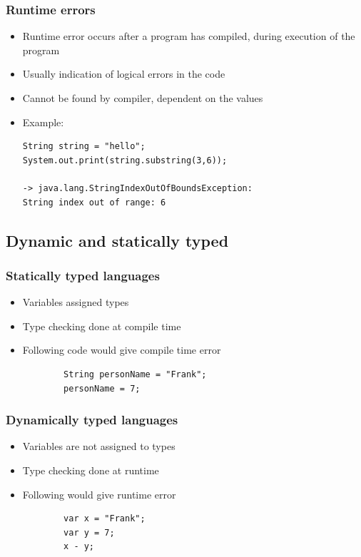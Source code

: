 \documentclass{beamer}
\begin{document}
\begin{frame}[fragile]
	\frametitle{Runtime errors}
		\begin{itemize}
			\item Runtime error occurs after a program has compiled, during execution of the program
			\item Usually indication of logical errors in the code
			\item Cannot be found by compiler, dependent on the values
			\item Example:
			\begin{verbatim}
String string = "hello";
System.out.print(string.substring(3,6));

-> java.lang.StringIndexOutOfBoundsException:
String index out of range: 6
			\end{verbatim}
		\end{itemize}
\end{frame}

\subsection{Dynamic and statically typed}

\begin{frame}[fragile]
  \frametitle{Statically typed languages}
	\begin{itemize}
		\item Variables assigned types
		\item Type checking done at compile time
		\item Following code would give compile time error
		\begin{verbatim}
		String personName = "Frank";
		personName = 7;
		\end{verbatim}
	\end{itemize}
\end{frame}

\begin{frame}[fragile]
  \frametitle{Dynamically typed languages}
	\begin{itemize}
		\item Variables are not assigned to types
		\item Type checking done at runtime
		\item Following would give runtime error
		\begin{verbatim}
		var x = "Frank";
		var y = 7;
		x - y;
		\end{verbatim}
	\end{itemize}
\end{frame}
\end{document}
